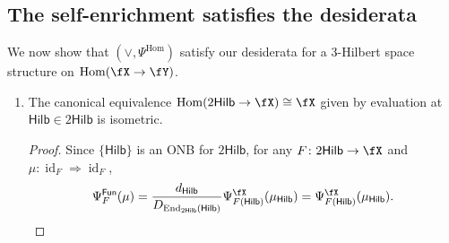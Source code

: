 \documentclass[12pt, reqno]{amsart}
\DeclareMathOperator{\End}{End}
\DeclareMathOperator{\Hom}{Hom}
\DeclareMathOperator{\id}{id}
\newcommand{\Fun}{\mathsf{Fun}}
\newcommand{\Hilb}{\mathsf{Hilb}}
\theoremstyle{plain}
\theoremstyle{definition}
\begin{document}
\subsection{The self-enrichment satisfies the desiderata}
\label{subsec:selfenrichmentdesiderata}
We now show that $(\vee,\Psi^{\Hom})$ satisfy our desiderata for a 3-Hilbert space structure on $\Hom(\fX\to \fY)$.
\begin{enumerate}[label=(D\arabic*)]

\item 
The canonical equivalence $\Hom(2\Hilb\to \fX)\cong \fX$ 
given by evaluation at $\Hilb\in 2\Hilb$ is isometric.
\begin{proof}
Since $\{\Hilb\}$ is an ONB for $2\Hilb$, for any $F\colon 2\Hilb\to \fX$ and $\mu\colon \id_F\Rightarrow\id_F$,
\[
\Psi_F^\Fun(\mu)
=
\frac{d_{\Hilb}}{D_{\End_{2\Hilb}(\Hilb)}}
\Psi^\fX_{F(\Hilb)}(\mu_{\Hilb})
=
\Psi^\fX_{F(\Hilb)}(\mu_{\Hilb}).
\qedhere
\]
\end{proof}


\end{enumerate}
\end{document}
